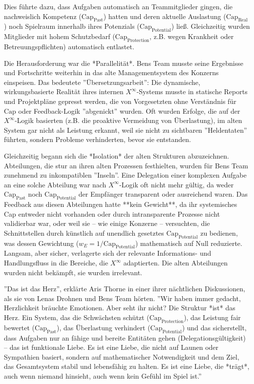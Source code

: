 \documentclass[12pt, ngerman, parskip=full]{scrartcl} %
\begin{document}
Dies führte dazu, dass Aufgaben automatisch an Teammitglieder gingen, die nachweislich Kompetenz ($\text{Cap}_{\text{Past}}$) hatten und deren aktuelle Auslastung ($\text{Cap}_{\text{Real}}$) noch Spielraum innerhalb ihres Potenzials ($\text{Cap}_{\text{Potential}}$) ließ. Gleichzeitig wurden Mitglieder mit hohem Schutzbedarf ($\text{Cap}_{\text{Protection}}$, z.B. wegen Krankheit oder Betreuungspflichten) automatisch entlastet.

Die Herausforderung war die *Parallelität*. Bens Team musste seine Ergebnisse und Fortschritte weiterhin in das alte Managementsystem des Konzerns einspeisen. Das bedeutete ''Übersetzungsarbeit'': Die dynamische, wirkungsbasierte Realität ihres internen $X^{\infty}$-Systems musste in statische Reports und Projektpläne gepresst werden, die von Vorgesetzten ohne Verständnis für $\text{Cap}$ oder Feedback-Logik ''abgenickt'' wurden. Oft wurden Erfolge, die auf der $X^{\infty}$-Logik basierten (z.B. die proaktive Vermeidung von Überlastung), im alten System gar nicht als Leistung erkannt, weil sie nicht zu sichtbaren ''Heldentaten'' führten, sondern Probleme verhinderten, bevor sie entstanden.

Gleichzeitig begann sich die *Isolation* der alten Strukturen abzuzeichnen. Abteilungen, die stur an ihren alten Prozessen festhielten, wurden für Bens Team zunehmend zu inkompatiblen ''Inseln''. Eine Delegation einer komplexen Aufgabe an eine solche Abteilung war nach $X^{\infty}$-Logik oft nicht mehr gültig, da weder $\text{Cap}_{\text{Past}}$ noch $\text{Cap}_{\text{Potential}}$ der Empfänger transparent oder ausreichend waren. Das Feedback aus diesen Abteilungen hatte **kein Gewicht**, da ihr systemisches Cap entweder nicht vorhanden oder durch intransparente Prozesse nicht validierbar war, oder weil sie – wie einige Konzerne – versuchten, die Schnittstellen durch künstlich auf unendlich gesetztes $\text{Cap}_{\text{Potential}}$ zu bedienen, was dessen Gewichtung ($w_E = 1/\text{Cap}_{\text{Potential}}$) mathematisch auf Null reduzierte. Langsam, aber sicher, verlagerte sich der relevante Informations- und Handlungsfluss in die Bereiche, die $X^{\infty}$ adaptierten. Die alten Abteilungen wurden nicht bekämpft, sie wurden irrelevant.

''Das ist das Herz'', erklärte Aris Thorne in einer ihrer nächtlichen Diskussionen, als sie von Lenas Drohnen und Bens Team hörten. ''Wir haben immer gedacht, Herzlichkeit bräuchte Emotionen. Aber seht ihr nicht? Die Struktur *ist* das Herz. Ein System, das die Schwächsten schützt ($\text{Cap}_{\text{Protection}}$), das Leistung fair bewertet ($\text{Cap}_{\text{Past}}$), das Überlastung verhindert ($\text{Cap}_{\text{Potential}}$) und das sicherstellt, dass Aufgaben nur an fähige und bereite Entitäten gehen (Delegationsgültigkeit) – das ist funktionale Liebe. Es ist eine Liebe, die nicht auf Launen oder Sympathien basiert, sondern auf mathematischer Notwendigkeit und dem Ziel, das Gesamtsystem stabil und lebensfähig zu halten. Es ist eine Liebe, die *trägt*, auch wenn niemand hinsieht, auch wenn kein Gefühl im Spiel ist.''
\end{document}
